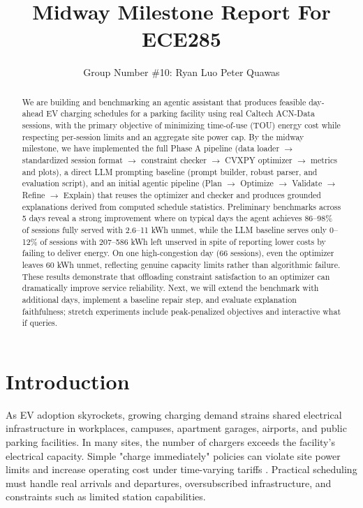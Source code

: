 \documentclass{article}
\title{Midway Milestone Report For ECE285}
\author{%
  Group Number \#10: Ryan Luo
  \And
  Peter Quawas \\
  \And
}
\begin{document}
\maketitle

\begin{abstract}
We are building and benchmarking an agentic assistant that produces feasible day-ahead EV charging schedules for a parking facility using real Caltech ACN-Data sessions, with the primary objective of minimizing time-of-use (TOU) energy cost while respecting per-session limits and an aggregate site power cap. By the midway milestone, we have implemented the full Phase A pipeline (data loader $\rightarrow$ standardized session format $\rightarrow$ constraint checker $\rightarrow$ CVXPY optimizer $\rightarrow$ metrics and plots), a direct LLM prompting baseline (prompt builder, robust parser, and evaluation script), and an initial agentic pipeline (Plan $\rightarrow$ Optimize $\rightarrow$ Validate $\rightarrow$ Refine $\rightarrow$ Explain) that reuses the optimizer and checker and produces grounded explanations derived from computed schedule statistics. Preliminary benchmarks across 5 days reveal a strong improvement where on typical days the agent achieves 86--98\% of sessions fully served with 2.6--11 kWh unmet, while the LLM baseline serves only 0--12\% of sessions with 207--586 kWh left unserved in spite of reporting lower costs by failing to deliver energy. On one high-congestion day (66 sessions), even the optimizer leaves 60 kWh unmet, reflecting genuine capacity limits rather than algorithmic failure. These results demonstrate that offloading constraint satisfaction to an optimizer can dramatically improve service reliability. Next, we will extend the benchmark with additional days, implement a baseline repair step, and evaluate explanation faithfulness; stretch experiments include peak-penalized objectives and interactive what if queries.
\end{abstract}

\section{Introduction}
As EV adoption skyrockets, growing charging demand strains shared electrical infrastructure in workplaces, campuses, apartment garages, airports, and public parking facilities. In many sites, the number of chargers exceeds the facility's electrical capacity. Simple "charge immediately" policies can violate site power limits and increase operating cost under time-varying tariffs \cite{lee2020acn}. Practical scheduling must handle real arrivals and departures, oversubscribed infrastructure, and constraints such as limited station capabilities.
\end{document}
